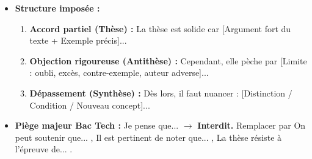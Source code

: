 \documentclass[11pt]{article}
\begin{document}
\begin{methode}
\begin{enumerate}
\begin{itemize}
        \item \textbf{Structure imposée :}
        \begin{enumerate}
            \item \textbf{Accord partiel (Thèse) :} \og La thèse est solide car [Argument fort du texte + Exemple précis]... \fg
            \item \textbf{Objection rigoureuse (Antithèse) :} \og Cependant, elle pèche par [Limite : oubli, excès, contre-exemple, auteur adverse]... \fg
            \item \textbf{Dépassement (Synthèse) :} \og Dès lors, il faut nuancer : [Distinction / Condition / Nouveau concept]... \fg
        \end{enumerate}
        \item \textbf{Piège majeur Bac Tech :} \og Je pense que... \fg $\rightarrow$ \textbf{Interdit.} Remplacer par \og On peut soutenir que... \fg, \og Il est pertinent de noter que... \fg, \og La thèse résiste à l'épreuve de... \fg.
    \end{itemize}
\end{enumerate}
\end{methode}
\end{document}
